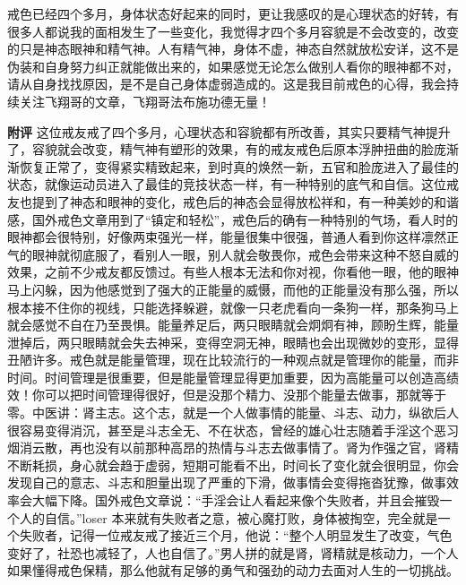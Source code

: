 \begin{case}
    戒色已经四个多月，身体状态好起来的同时，更让我感叹的是心理状态的好转，有很多人都说我的面相发生了一些变化，我觉得才四个多月容貌是不会改变的，改变的只是神态眼神和精气神。人有精气神，身体不虚，神态自然就放松安详，这不是伪装和自身努力纠正就能做出来的，如果感觉无论怎么做别人看你的眼神都不对，请从自身找找原因，是不是自己身体虚弱造成的。这是我目前戒色的心得，我会持续关注飞翔哥的文章，飞翔哥法布施功德无量！

    \textbf{附评} 这位戒友戒了四个多月，心理状态和容貌都有所改善，其实只要精气神提升了，容貌就会改变，精气神有塑形的效果，有的戒友戒色后原本浮肿扭曲的脸庞渐渐恢复正常了，变得紧实精致起来，到时真的焕然一新，五官和脸庞进入了最佳的状态，就像运动员进入了最佳的竞技状态一样，有一种特别的底气和自信。这位戒友也提到了神态和眼神的变化，戒色后的神态会显得放松祥和，有一种美妙的和谐感，国外戒色文章用到了“镇定和轻松”，戒色后的确有一种特别的气场，看人时的眼神都会很特别，好像两束强光一样，能量很集中很强，普通人看到你这样凛然正气的眼神就彻底服了，看别人一眼，别人就会敬畏你，戒色会带来这种不怒自威的效果，之前不少戒友都反馈过。有些人根本无法和你对视，你看他一眼，他的眼神马上闪躲，因为他感觉到了强大的正能量的威慑，而他的正能量没有那么强，所以根本接不住你的视线，只能选择躲避，就像一只老虎看向一条狗一样，那条狗马上就会感觉不自在乃至畏惧。能量养足后，两只眼睛就会炯炯有神，顾盼生辉，能量泄掉后，两只眼睛就会失去神采，变得空洞无神，眼睛也会出现微妙的变形，显得丑陋许多。戒色就是能量管理，现在比较流行的一种观点就是管理你的能量，而非时间。时间管理是很重要，但是能量管理显得更加重要，因为高能量可以创造高绩效！你可以把时间管理得很好，但是没那个精力、没那个能量去做事，那就等于零。中医讲：肾主志。这个志，就是一个人做事情的能量、斗志、动力，纵欲后人很容易变得消沉，甚至是斗志全无、不在状态，曾经的雄心壮志随着手淫这个恶习烟消云散，再也没有以前那种高昂的热情与斗志去做事情了。肾为作强之官，肾精不断耗损，身心就会趋于虚弱，短期可能看不出，时间长了变化就会很明显，你会发现自己的意志、斗志和胆量出现了严重的下滑，做事情会变得拖沓犹豫，做事效率会大幅下降。国外戒色文章说：“手淫会让人看起来像个失败者，并且会摧毁一个人的自信。”loser 本来就有失败者之意，被心魔打败，身体被掏空，完全就是一个失败者，记得一位戒友戒了接近三个月，他说：“整个人明显发生了改变，气色变好了，社恐也减轻了，人也自信了。”男人拼的就是肾，肾精就是核动力，一个人如果懂得戒色保精，那么他就有足够的勇气和强劲的动力去面对人生的一切挑战。
\end{case}

